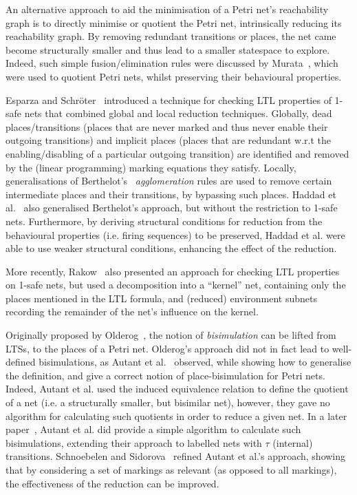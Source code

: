 An alternative approach to aid the minimisation of a Petri net's reachability
graph is to directly minimise or quotient the Petri net, intrinsically reducing
its reachability graph. By removing redundant transitions or places, the net
came become structurally smaller and thus lead to a smaller statespace to
explore. Indeed, such simple fusion/elimination rules were discussed by
Murata~\cite{Murata1989}, which were used to quotient Petri nets, whilst
preserving their behavioural properties.

{Esparza and Schr\"oter}~\cite{Esparza2001a} introduced a technique for
checking LTL properties of 1-safe nets that combined global and local reduction
techniques. Globally, dead places/transitions (places that are never marked and
thus never enable their outgoing transitions) and implicit places (places that
are redundant w.r.t the enabling/disabling of a particular outgoing transition)
are identified and removed by the (linear programming) marking equations they
satisfy. Locally, generalisations of Berthelot's~\cite{Berthelot1986}
\emph{agglomeration} rules are used to remove certain intermediate places and
their transitions, by bypassing such places. {Haddad et al.}~\cite{Haddad2006}
also generalised Berthelot's approach, but without the restriction to 1-safe
nets. Furthermore, by deriving structural conditions for reduction from the
behavioural properties (i.e.  firing sequences) to be preserved, {Haddad et
al.} were able to use weaker structural conditions, enhancing the effect of the
reduction.

More recently, Rakow~\cite{Rakow2009} also presented an approach for checking
LTL properties on 1-safe nets, but used a decomposition into a ``kernel'' net,
containing only the places mentioned in the LTL formula, and (reduced)
environment subnets recording the remainder of the net's influence on the
kernel.

Originally proposed by Olderog~\cite{Olderog1989}, the notion of
\emph{bisimulation} can be lifted from LTSs, to the places of a Petri net.
Olderog's approach did not in fact lead to well-defined bisimulations, as
{Autant et al.}~\cite{Autant1991} observed, while showing how to generalise the
definition, and give a correct notion of place-bisimulation for Petri nets.
Indeed, {Autant et al.} used the induced equivalence relation to define the
quotient of a net (i.e. a structurally smaller, but bisimilar net), however,
they gave no algorithm for calculating such quotients in order to reduce a
given net. In a later paper~\cite{Autant1994}, {Autant et al.} did provide a
simple algorithm to calculate such bisimulations, extending their approach to
labelled nets with $\tau$ (internal) transitions. {Schnoebelen and
Sidorova}~\cite{Schnoebelen2000} refined {Autant et al.}'s approach, showing
that by considering a set of markings as relevant (as opposed to all markings),
the effectiveness of the reduction can be improved.
